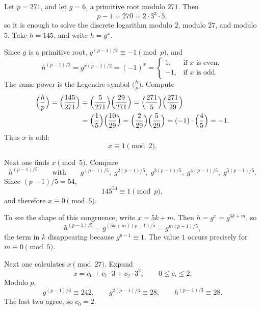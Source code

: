 \begin{example}[A smooth order: \(p=271\)]
Let \(p=271\), and let \(g=6\), a primitive root modulo \(271\). Then
\[
    p-1 = 270 = 2\cdot 3^3\cdot 5,
\]
so it is enough to solve the discrete logarithm modulo \(2\), modulo
\(27\), and modulo \(5\). Take \(h=145\), and write \(h=g^x\).

Since \(g\) is a primitive root, \(g^{(p-1)/2}\equiv -1\pmod{p}\), and
\[
    h^{(p-1)/2}
    = g^{x(p-1)/2}
    = (-1)^x
    =
    \begin{cases}
        1, & \text{if \(x\) is even},\\
        -1, & \text{if \(x\) is odd}.
    \end{cases}
\]
The same power is the Legendre symbol \(\bigl(\frac{h}{p}\bigr)\).
Compute
\begin{align*}
    \Bigl(\frac{h}{p}\Bigr)
    = \Bigl(\frac{145}{271}\Bigr)
    &= \Bigl(\frac{5}{271}\Bigr)\Bigl(\frac{29}{271}\Bigr)
     = \Bigl(\frac{271}{5}\Bigr)\Bigl(\frac{271}{29}\Bigr)\\
    &= \Bigl(\frac{1}{5}\Bigr)\Bigl(\frac{10}{29}\Bigr)
     = \Bigl(\frac{2}{29}\Bigr)\Bigl(\frac{5}{29}\Bigr)
     = (-1)\cdot\Bigl(\frac{4}{5}\Bigr)
     = -1.
\end{align*}
Thus \(x\) is odd:
\[
    x\equiv 1\pmod{2}.
\]


Next one finds \(x\pmod{5}\). Compare
\[
    h^{(p-1)/5}
    \qquad\text{with}\qquad
    g^{(p-1)/5},\;
    g^{2(p-1)/5},\;
    g^{3(p-1)/5},\;
    g^{4(p-1)/5},\;
    g^{5(p-1)/5}.
\]
Since \((p-1)/5=54\),
\[
    145^{54}\equiv 1\pmod{p},
\]
and therefore \(x\equiv 0\pmod{5}\).

To see the shape of this congruence, write \(x=5k+m\). Then
\(h=g^x=g^{5k+m}\), so
\[
    h^{(p-1)/5}
    = g^{(5k+m)(p-1)/5}
    = g^{m(p-1)/5},
\]
the term in \(k\) disappearing because \(g^{p-1}\equiv 1\). The value
\(1\) occurs precisely for \(m\equiv 0\pmod{5}\).

Next one calculates \(x\pmod{27}\). Expand
\[
    x = c_0 + c_1\cdot 3 + c_2\cdot 3^2,
    \qquad 0\le c_i\le 2.
\]
Modulo \(p\),
\[
    g^{(p-1)/3}\equiv 242, \qquad
    g^{2(p-1)/3}\equiv 28, \qquad
    h^{(p-1)/3}\equiv 28.
\]
The last two agree, so \(c_0=2\).


\end{example}
